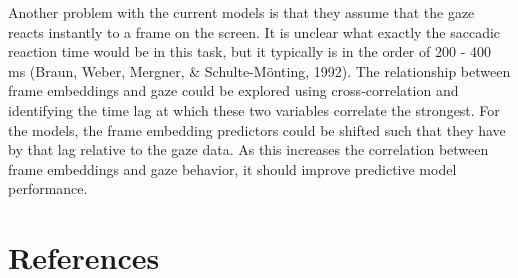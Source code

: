 \documentclass[
  man,floatsintext]{apa6}
\begin{document}
Another problem with the current models is that they assume that the gaze reacts instantly to a frame on the screen. It is unclear what exactly the saccadic reaction time would be in this task, but it typically is in the order of 200 - 400 ms (Braun, Weber, Mergner, \& Schulte-Mönting, 1992). The relationship between frame embeddings and gaze could be explored using cross-correlation and identifying the time lag at which these two variables correlate the strongest. For the models, the frame embedding predictors could be shifted such that they have by that lag relative to the gaze data. As this increases the correlation between frame embeddings and gaze behavior, it should improve predictive model performance.

\newpage

\hypertarget{references}{%
\section{References}\label{references}}
\end{document}
